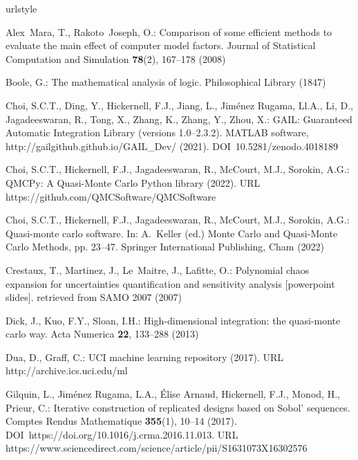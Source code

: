 \documentclass[graybox]{svmult}
\begin{document}
\begin{thebibliography}{10}
\providecommand{\url}[1]{{#1}}
\providecommand{\urlprefix}{URL }
\expandafter\ifx\csname urlstyle\endcsname\relax
  \providecommand{\doi}[1]{DOI~\discretionary{}{}{}#1}\else
  \providecommand{\doi}{DOI~\discretionary{}{}{}\begingroup
  \urlstyle{rm}\Url}\fi

Alex~Mara, T., Rakoto~Joseph, O.: Comparison of some efficient methods to
  evaluate the main effect of computer model factors.
\newblock Journal of Statistical Computation and Simulation \textbf{78}(2),
  167--178 (2008)

Boole, G.: The mathematical analysis of logic.
\newblock Philosophical Library (1847)

Choi, S.C.T., Ding, Y., Hickernell, F.J., Jiang, L., {Jim\'enez Rugama},
  {\relax Ll}.A., Li, D., Jagadeeswaran, R., Tong, X., Zhang, K., Zhang, Y.,
  Zhou, X.: {GAIL}: {G}uaranteed {A}utomatic {I}ntegration {L}ibrary (versions
  1.0--2.3.2).
\newblock MATLAB software, \url{http://gailgithub.github.io/GAIL\_Dev/} (2021).
\newblock \doi{10.5281/zenodo.4018189}

Choi, S.C.T., Hickernell, F.J., Jagadeeswaran, R., McCourt, M.J., Sorokin,
  A.G.: {QMCPy}: A {Q}uasi-{M}onte {C}arlo {P}ython library (2022).
\newblock \urlprefix\url{https://github.com/QMCSoftware/QMCSoftware}

Choi, S.C.T., Hickernell, F.J., Jagadeeswaran, R., McCourt, M.J., Sorokin,
  A.G.: Quasi-monte carlo software.
\newblock In: A.~Keller (ed.) Monte Carlo and Quasi-Monte Carlo Methods, pp.
  23--47. Springer International Publishing, Cham (2022)

Crestaux, T., Martinez, J., Le~Maitre, J., Lafitte, O.: Polynomial chaos
  expansion for uncertainties quantification and sensitivity analysis
  [powerpoint slides]. retrieved from SAMO 2007 (2007)

Dick, J., Kuo, F.Y., Sloan, I.H.: High-dimensional integration: the quasi-monte
  carlo way.
\newblock Acta Numerica \textbf{22}, 133--288 (2013)

Dua, D., Graff, C.: {UCI} machine learning repository (2017).
\newblock \urlprefix\url{http://archive.ics.uci.edu/ml}

Gilquin, L., {Jiménez Rugama}, L.A., Élise Arnaud, Hickernell, F.J., Monod,
  H., Prieur, C.: Iterative construction of replicated designs based on Sobol'
  sequences.
\newblock Comptes Rendus Mathematique \textbf{355}(1), 10--14 (2017).
\newblock \doi{https://doi.org/10.1016/j.crma.2016.11.013}.
\newblock
  \urlprefix\url{https://www.sciencedirect.com/science/article/pii/S1631073X16302576}


\end{thebibliography}
\end{document}
